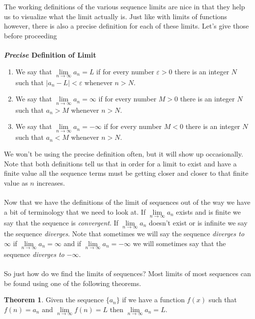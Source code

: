 \documentclass[10pt,reqno]{book}
\theoremstyle{definition}
\newtheorem{theorem}{Theorem}[section]
\begin{document}
	The working definitions of the various sequence limits are nice in that they help us to visualize what the limit actually is. Just like with limits of functions however, there is also a precise definition for each of these limits. Let's give those before proceeding\\ \\
	\textbf{\textit{Precise} Definition of Limit}
	\begin{enumerate}
		\item We say that $ \lim\limits_{n \to \infty} a_n = L $ if for every number $ \varepsilon > 0 $ there is an integer $ N $ such that $ |a_n - L| < \varepsilon $ whenever $ n > N $.
		
		\item We say that $ \lim\limits_{n \to \infty} a_n = \infty  $ if for every number $ M > 0 $ there is an integer $ N $ such that $ a_n > M $ whenever $ n > N $.
		
		\item We say that $ \lim\limits_{n \to \infty} a_n = -\infty $ if for every number $ M < 0 $ there is an integer $ N $ such that $ a_n < M $ whenever $ n > N $.
	\end{enumerate}
	We won't be using the precise definition often, but it will show up occasionally. Note that both definitions tell us that in order for a limit to exist and have a finite value all the sequence terms must be getting closer and closer to that finite value as $ n $ increases.\\ \\
	Now that we have the definitions of the limit of sequences out of the way we have a bit of terminology that we need to look at. If $ \lim\limits_{n \to \infty} a_n  $ exists and is finite we say that the sequence is \textit{convergent}. If $ \lim\limits_{n \to \infty} a_n  $ doesn't exist or is infinite we say the sequence \textit{diverges}. Note that sometimes we will say the sequence \textit{diverges to} $ \infty $ if $ \lim\limits_{n \to \infty} a_n = \infty $ and if $ \lim\limits_{n \to \infty} a_n = -\infty $ we will sometimes say that the sequence \textit{diverges to} $ -\infty $.\\ \\
	So just how do we find the limits of sequences? Most limits of most sequences can be found using one of the following theorems.
	\begin{theorem}
		Given the sequence $ \{ a_n \} $ if we have a function $ f(x) $ such that $ f(n) = a_n $ and $ \lim\limits_{n \to \infty} f(n) = L $ then $ \lim\limits_{n \to \infty} a_n = L $.
	\end{theorem}
\end{document}

